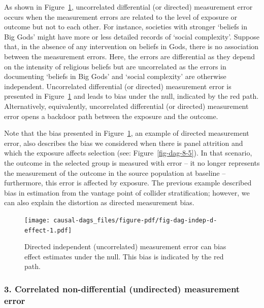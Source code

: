 \documentclass[
  singlecolumn]{article}
\begin{document}
As shown in Figure~\ref{fig-dag-indep-d-effect}, uncorrelated
differential (or directed) measurement error occurs when the measurement
errors are related to the level of exposure or outcome but not to each
other. For instance, societies with stronger `beliefs in Big Gods' might
have more or less detailed records of `social complexity'. Suppose that,
in the absence of any intervention on beliefs in Gods, there is no
association between the measurement errors. Here, the errors are
differential as they depend on the intensity of religious beliefs but
are uncorrelated as the errors in documenting `beliefs in Big Gods' and
`social complexity' are otherwise independent. Uncorrelated differential
(or directed) measurement error is presented in
Figure~\ref{fig-dag-indep-d-effect} and leads to bias under the null,
indicated by the red path. Alternatively, equivalently, uncorrelated
differential (or directed) measurement error opens a backdoor path
between the exposure and the outcome.

Note that the bias presented in Figure~\ref{fig-dag-indep-d-effect}, an
example of directed measurement error, also describes the bias we
considered when there is panel attrition and which the exposure affects
selection (see: Figure~\ref{fig-dag-8-5}). In that scenario, the outcome
in the selected group is measured with error -- it no longer represents
the measurement of the outcome in the source population at baseline --
furthermore, this error is affected by exposure. The previous example
described bias in estimation from the vantage point of collider
stratification; however, we can also explain the distortion as directed
measurement bias.

\begin{figure}

{\centering \texttt{[image: causal-dags\_files/figure-pdf/fig-dag-indep-d-effect-1.pdf]}

}

\caption{\label{fig-dag-indep-d-effect}Directed independent
(uncorrelated) measurement error can bias effect estimates under the
null. This bias is indicated by the red path.}

\end{figure}

\hypertarget{correlated-non-differential-undirected-measurement-error}{%
\subsubsection{3. Correlated non-differential (undirected) measurement
error}\label{correlated-non-differential-undirected-measurement-error}}
\end{document}
